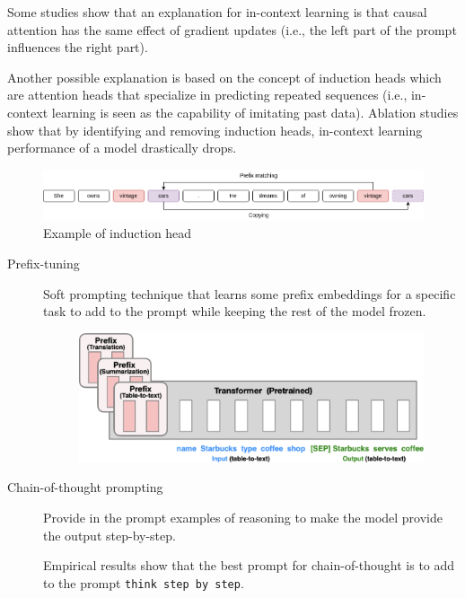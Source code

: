 \begin{remark}
    Some studies show that an explanation for in-context learning is that causal attention has the same effect of gradient updates (i.e., the left part of the prompt influences the right part).

    Another possible explanation is based on the concept of induction heads which are attention heads that specialize in predicting repeated sequences (i.e., in-context learning is seen as the capability of imitating past data). Ablation studies show that by identifying and removing induction heads, in-context learning performance of a model drastically drops.

    \begin{figure}[H]
        \centering
        \includegraphics[width=0.9\linewidth]{./img/induction_head.png}
        \caption{Example of induction head}
    \end{figure}
\end{remark}

\begin{description}
    \item[Prefix-tuning] 
        Soft prompting technique that learns some prefix embeddings for a specific task to add to the prompt while keeping the rest of the model frozen.

        \begin{figure}[H]
            \centering
            \includegraphics[width=0.65\linewidth]{./img/prefix_tuning.png}
        \end{figure}

    \item[Chain-of-thought prompting] 
        Provide in the prompt examples of reasoning to make the model provide the output step-by-step.

        \begin{remark}
            Empirical results show that the best prompt for chain-of-thought is to add to the prompt \texttt{think step by step}.
        \end{remark}
\end{description}